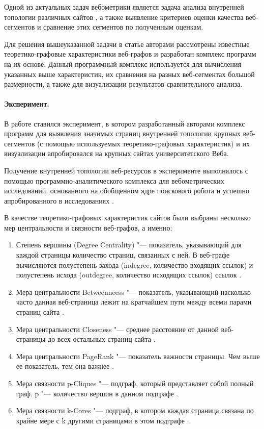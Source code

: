 Одной из актуальных задач вебометрики является задача анализа внутренней топологии различных сайтов \cite{Thelwall,BlekanovSergeevMaksimov,MaksimovBlekanov,BlekanovSergeevMaksimovBOWTIE}, а также выявление критериев оценки качества веб-сегментов и сравнение этих сегментов по полученным оценкам.  

Для решения вышеуказанной задачи в статье авторами рассмотрены известные теоретико-графовые характеристики веб-графов и разработан комплекс программ на их основе. Данный программный комплекс используется для вычисления указанных выше характеристик, их сравнения на разных веб-сегментах большой размерности, а также для визуализации результатов сравнительного анализа.  

\paragraph{Эксперимент.} В работе ставился эксперимент, в котором разработанный авторами комплекс программ для выявления значимых страниц внутренней топологии крупных веб-сегментов (с помощью используемых теоретико-графовых характеристик) и их визуализации апробировался на крупных сайтах университетского Веба. 

Получение внутренней топологии веб-ресурсов в эксперименте выполнялось с помощью программно-аналитического комплекса для вебометрических исследований, основанного на обобщенном ядре поискового робота \cite{BlekanovSergeevMartynenko} и успешно апробированного в исследованиях \cite{BlekanovSergeevMaksimov,MaksimovBlekanov,BlekanovSergeevMaksimovBOWTIE}.

В качестве теоретико-графовых характеристик сайтов были выбраны несколько мер центральности и связности веб-графов, а именно:
\begin{enumerate}
	\item Степень вершины (Degree Centrality) "--- показатель, указывающий для каждой страницы количество страниц, связанных с ней. В веб-графе вычисляются полустепень захода (indegree, количество входящих ссылок) и полустепень исхода (outdegree, количество исходящих ссылок) ссылок \cite{WassermanFaust,OrtegaAguillo}.
		\item Мера центральности Betweenneess "--- показатель, указывающий насколько часто данная веб-страница лежит на кратчайшем пути между всеми парами страниц сайта \cite{WassermanFaust,OrtegaAguillo}.
		\item Мера центральности Closeness "--- среднее расстояние от данной веб-страницы до всех остальных страниц сайта \cite{WassermanFaust}.
		\item Мера центральности PageRank "--- показатель важности страницы. Чем выше ее показатель, тем она важнее \cite{PageBrinMotwani}.
		\item Мера связности p-Cliques "--- подграф, который представляет собой полный граф. p "--- количество вершин в данном подграфе \cite{OrtegaAguillo}.
		\item Мера связности k-Cores "--- подграф, в котором каждая страница связана по крайне мере с k другими страницами в этом подграфе \cite{OrtegaAguillo}.
\end{enumerate}

